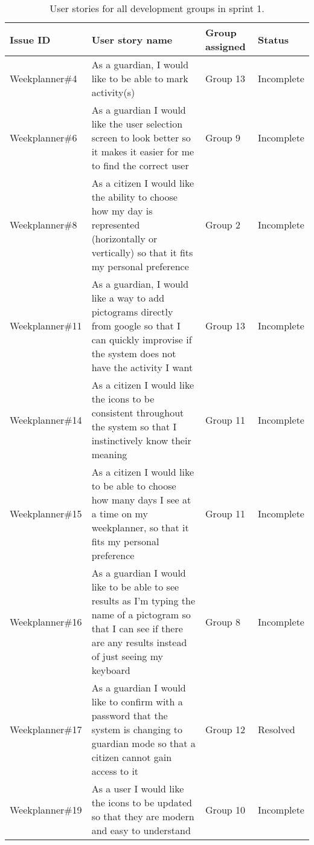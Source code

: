\begin{table}[H]
    \begin{tabular}{|p{2.8cm}|p{7cm}|p{2cm}|p{2cm}|}
    \hline
    Issue ID        & User story name                                                                                                                                                          & Group assigned  & Status     \\ \hline
    Weekplanner\#4  & As a guardian, I would like to be able to mark activity(s)                                                                                                               & Group 13        & Incomplete    \\ \hline
    Weekplanner\#6  & As a guardian I would like the user selection screen to look better so it makes it easier for me to find the correct user                                                & Group 9         & Incomplete   \\ \hline
    Weekplanner\#8  & As a citizen I would like the ability to choose how my day is represented (horizontally or vertically) so that it fits my personal preference                            & Group 2         & Incomplete    \\ \hline
    Weekplanner\#11 & As a guardian, I would like a way to add pictograms directly from google so that I can quickly improvise if the system does not have the activity I want                 & Group 13        & Incomplete    \\ \hline
    Weekplanner\#14 & As a citizen I would like the icons to be consistent throughout the system so that I instinctively know their meaning                                                    & Group 11        & Incomplete    \\ \hline
    Weekplanner\#15 & As a citizen I would like to be able to choose how many days I see at a time on my weekplanner, so that it fits my personal preference                                   & Group 11        & Incomplete    \\ \hline
    Weekplanner\#16 & As a guardian I would like to be able to see results as I'm typing the name of a pictogram so that I can see if there are any results instead of just seeing my keyboard & Group 8         & Incomplete    \\ \hline
    Weekplanner\#17 & As a guardian I would like to confirm with a password that the system is changing to guardian mode so that a citizen cannot gain access to it                            & Group 12        & Resolved   \\ \hline
    Weekplanner\#19 & As a user I would like the icons to be updated so that they are modern and easy to understand                                                                            & Group 10        & Incomplete   \\ \hline
    \end{tabular}
    \caption{User stories for all development groups in sprint 1.}\label{table:user-stories-sprint-1-review}
\end{table}

